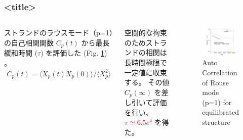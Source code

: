 \documentclass[12pt, dvipdfmx]{beamer}
\begin{document}
\begin{frame}
	\frametitle{<title>}
		\begin{columns}[totalwidth=\linewidth]
			ストランドのラウスモード（p=1）の自己相関関数 $C_p(t)$ から最長緩和時間 ($\tau$) を評価した (Fig. \ref{ac-xp}) 。
			\begin{align*}
				C_p(t) = \langle X_p(t)X_p(0) \rangle/\langle X_p^2 \rangle
			\end{align*}
			
			空間的な拘束のためストランドの相関は長時間極限で一定値に収束する。
			その値 $C_p(\infty)$ を差し引いて評価を行い、\textcolor{red}{$\tau \simeq 6.5e^{4}$} を得た。
			
			\begin{figure}[htb]
				\centering
					\includegraphics[width=.8\textwidth]{Xp_1_org.png}
					\caption{Auto Correlation of Rouse mode (p=1) for equilibrated structure}
					\label{ac-xp}
			\end{figure}
			\end{columns}
\end{frame}






\end{document}
